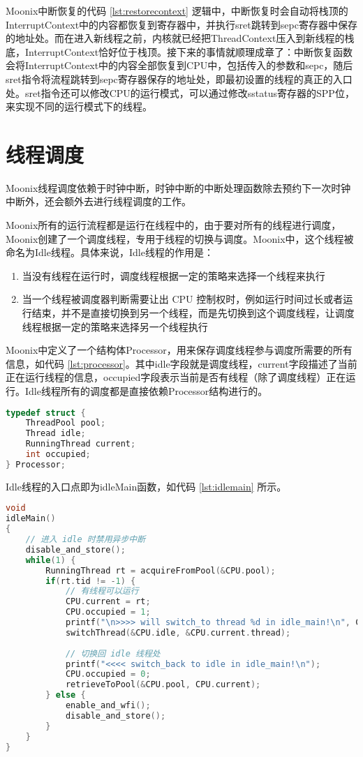 Moonix中断恢复的代码 \ref{lst:restorecontext} 逻辑中，中断恢复时会自动将栈顶的InterruptContext中的内容都恢复到寄存器中，并执行sret跳转到sepc寄存器中保存的地址处。而在进入新线程之前，内核就已经把ThreadContext压入到新线程的栈底，InterruptContext恰好位于栈顶。接下来的事情就顺理成章了：中断恢复函数会将InterruptContext中的内容全部恢复到CPU中，包括传入的参数和sepc，随后sret指令将流程跳转到sepc寄存器保存的地址处，即最初设置的线程的真正的入口处。sret指令还可以修改CPU的运行模式，可以通过修改sstatus寄存器的SPP位，来实现不同的运行模式下的线程。

\section{线程调度}

Moonix线程调度依赖于时钟中断，时钟中断的中断处理函数除去预约下一次时钟中断外，还会额外去进行线程调度的工作。

Moonix所有的运行流程都是运行在线程中的，由于要对所有的线程进行调度，Moonix创建了一个调度线程，专用于线程的切换与调度。Moonix中，这个线程被命名为Idle线程。具体来说，Idle线程的作用是：

\begin{enumerate}
	\item 当没有线程在运行时，调度线程根据一定的策略来选择一个线程来执行
	\item 当一个线程被调度器判断需要让出 CPU 控制权时，例如运行时间过长或者运行结束，并不是直接切换到另一个线程，而是先切换到这个调度线程，让调度线程根据一定的策略来选择另一个线程执行
\end{enumerate}

Moonix中定义了一个结构体Processor，用来保存调度线程参与调度所需要的所有信息，如代码 \ref{lst:processor}。其中idle字段就是调度线程，current字段描述了当前正在运行线程的信息，occupied字段表示当前是否有线程（除了调度线程）正在运行。Idle线程所有的调度都是直接依赖Processor结构进行的。

\begin{lstlisting}[language={C}, caption={Processor结构体}, label={lst:processor}]
typedef struct {
	ThreadPool pool;
	Thread idle;
	RunningThread current;
	int occupied;
} Processor;
\end{lstlisting}

Idle线程的入口点即为idleMain函数，如代码 \ref{lst:idlemain} 所示。

\begin{lstlisting}[language={C}, caption={idleMain函数}, label={lst:idlemain}]
void
idleMain()
{
	// 进入 idle 时禁用异步中断
	disable_and_store();
	while(1) {
		RunningThread rt = acquireFromPool(&CPU.pool);
		if(rt.tid != -1) {
			// 有线程可以运行
			CPU.current = rt;
			CPU.occupied = 1;
			printf("\n>>>> will switch_to thread %d in idle_main!\n", CPU.current.tid);
			switchThread(&CPU.idle, &CPU.current.thread);
			
			// 切换回 idle 线程处
			printf("<<<< switch_back to idle in idle_main!\n");
			CPU.occupied = 0;
			retrieveToPool(&CPU.pool, CPU.current);
		} else {
			enable_and_wfi();
			disable_and_store();
		}
	}
}
\end{lstlisting}


